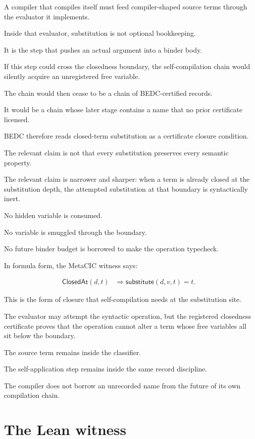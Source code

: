 A compiler that compiles itself must feed compiler-shaped source terms through
the evaluator it implements.

Inside that evaluator, substitution is not optional bookkeeping.

It is the step that pushes an actual argument into a binder body.

If this step could cross the closedness boundary, the self-compilation chain
would silently acquire an unregistered free variable.

The chain would then cease to be a chain of BEDC-certified records.

It would be a chain whose later stage contains a name that no prior certificate
licensed.

BEDC therefore reads closed-term substitution as a certificate closure
condition.

The relevant claim is not that every substitution preserves every semantic
property.

The relevant claim is narrower and sharper: when a term is already closed at the
substitution depth, the attempted substitution at that boundary is syntactically
inert.

No hidden variable is consumed.

No variable is smuggled through the boundary.

No future binder budget is borrowed to make the operation typecheck.

In formula form, the MetaCIC witness says:

$$
\begin{aligned}
  \mathsf{ClosedAt}(d,t)
  &\Rightarrow
  \mathsf{substitute}(d,v,t)=t.
\end{aligned}
$$

This is the form of closure that self-compilation needs at the substitution
site.

The evaluator may attempt the syntactic operation, but the registered
closedness certificate proves that the operation cannot alter a term whose free
variables all sit below the boundary.

The source term remains inside the classifier.

The self-application step remains inside the same record discipline.

The compiler does not borrow an unrecorded name from the future of its own
compilation chain.

\section{The Lean witness}
\label{sec:closed-term-substitution-lean-witness}

